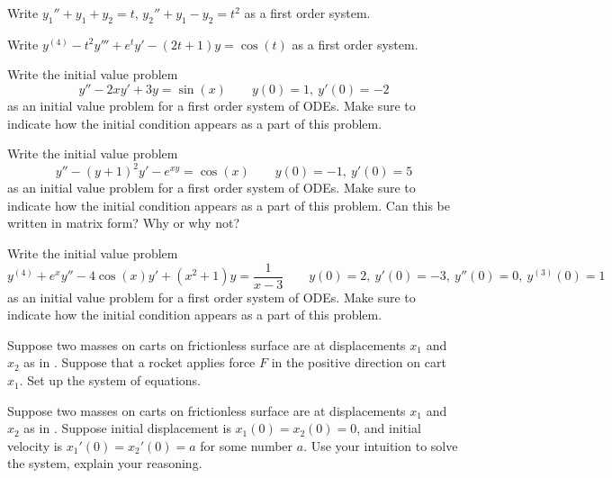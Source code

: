 \begin{exercise}\ansMark%
Write $y_1'' + y_1 + y_2 = t$, 
$y_2'' + y_1 - y_2 = t^2$ as a first order system.
\end{exercise}

\begin{exercise}
Write $y^{(4)} - t^2 y''' + e^t y' - (2t+1)y = \cos(t)$ as a first order system.
\end{exercise}

\begin{exercise}
Write the initial value problem 
\[ y'' - 2xy' + 3y = \sin(x) \qquad y(0) = 1,\ y'(0) = -2 \] as an initial value problem for a first order system of ODEs. Make sure to indicate how the initial condition appears as a part of this problem. 
\end{exercise}

\begin{exercise}
Write the initial value problem 
\[ y'' - (y+1)^2 y' - e^{xy} = \cos(x) \qquad y(0) = -1,\ y'(0) = 5 \] as an initial value problem for a first order system of ODEs. Make sure to indicate how the initial condition appears as a part of this problem. Can this be written in matrix form? Why or why not?
\end{exercise}

\begin{exercise}
Write the initial value problem 
\[ y^{(4)} + e^x y'' - 4\cos(x)y' + (x^2 + 1)y = \frac{1}{x-3} \qquad y(0) = 2,\ y'(0) = -3,\ y''(0) = 0,\ y^{(3)}(0) = 1 \] as an initial value problem for a first order system of ODEs. Make sure to indicate how the initial condition appears as a part of this problem. 
\end{exercise}

\begin{exercise}
Suppose two masses on carts on frictionless surface are at 
displacements $x_1$ and $x_2$ as in .
Suppose that a rocket applies force $F$ in the positive direction on cart
$x_1$.  Set up the system of equations.
\end{exercise}

\begin{exercise}\ansMark%
Suppose two masses on carts on frictionless surface are at 
displacements $x_1$ and $x_2$ as in .
Suppose initial displacement is $x_1(0)=x_2(0)=0$, and initial velocity is $x_1'(0) = x_2'(0) = a$ for some number $a$.
Use your intuition
to solve the system, explain your reasoning.
\end{exercise}

